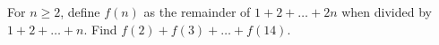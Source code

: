 For $n\geq 2$, define $f(n)$ as the remainder of $1+2+\dots+2n$ when divided by $1+2+\dots +n$. Find $f(2)+f(3)+\dots+f(14)$.
